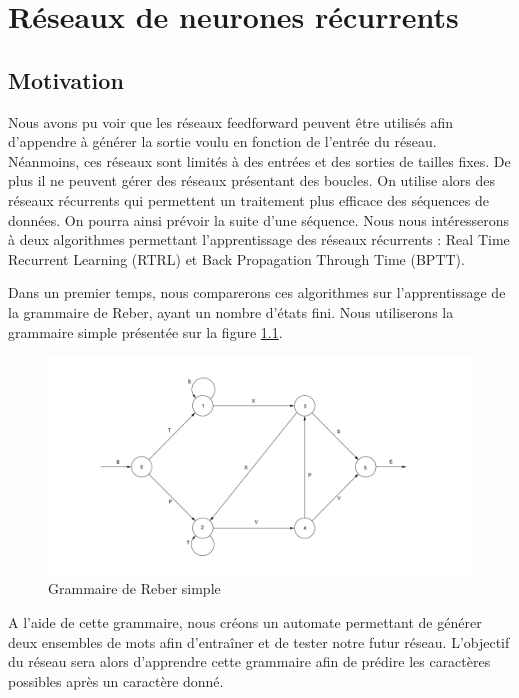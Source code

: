 \documentclass{report}
\begin{document}
\chapter{Réseaux de neurones récurrents}
\section{Motivation}
Nous avons pu voir que les réseaux feedforward peuvent être utilisés afin d'appendre à générer la sortie voulu en fonction de l'entrée du réseau. 
Néanmoins, ces réseaux sont limités à des entrées et des sorties de tailles fixes. De plus il ne peuvent gérer des réseaux présentant des boucles. On utilise alors des réseaux récurrents qui permettent un traitement plus efficace des séquences de données. On pourra ainsi prévoir la suite d'une séquence.
\bigbreak
Nous nous intéresserons à deux algorithmes permettant l'apprentissage des réseaux récurrents : Real Time Recurrent Learning (RTRL) et Back Propagation Through Time (BPTT).

Dans un premier temps, nous comparerons ces algorithmes sur l'apprentissage de la grammaire de Reber, ayant un nombre d'états fini. Nous utiliserons la grammaire simple présentée sur la figure \ref{Grammaire de Reber simple}.

\begin{figure}[h!]
\begin{center}
\includegraphics[scale=0.3]{images/reber_simple.png}
\caption{Grammaire de Reber simple}
\label{Grammaire de Reber simple}
\end{center}
\end{figure}

A l'aide de cette grammaire, nous créons un automate permettant de générer deux ensembles de mots afin d'entraîner et de tester notre futur réseau. L'objectif du réseau sera alors d'apprendre cette grammaire afin de prédire les caractères possibles après un caractère donné.
\end{document}
